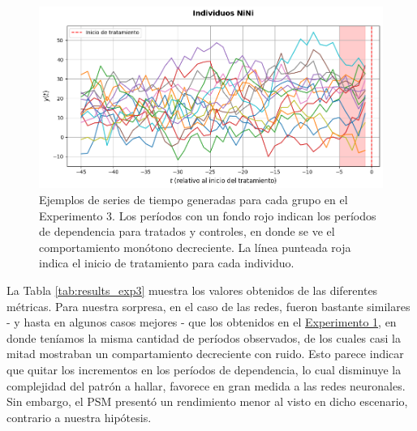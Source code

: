 \documentclass[../../main.tex]{subfiles}
\begin{document}
\begin{figure}[ht]
    \begin{minipage}{0.6\textwidth}
        \centering
        \includegraphics[scale=0.3]{figs/Exp3/ninis_sim63.png}
    \end{minipage}
    \caption{Ejemplos de series de tiempo generadas para cada grupo en el Experimento 3.
    Los períodos con un fondo rojo indican los períodos de dependencia para tratados y
    controles, en donde se ve el comportamiento monótono decreciente. La línea
    punteada roja indica el inicio de tratamiento para cada individuo.}
    \label{fig:time_series_exp3}
\end{figure}

La Tabla \ref{tab:results_exp3} muestra los valores obtenidos de las diferentes métricas.
Para nuestra sorpresa, en el caso de las redes, fueron bastante similares - y hasta en
algunos casos mejores - que los obtenidos en el \hyperref[sec:exp1]{Experimento 1}, en
donde teníamos la misma cantidad de períodos observados, de los cuales casi la mitad
mostraban un compartamiento decreciente con ruido. Esto parece indicar que quitar los
incrementos en los períodos de dependencia, lo cual disminuye la complejidad del patrón a
hallar, favorece en gran medida a las redes neuronales. Sin embargo, el PSM presentó un
rendimiento menor al visto en dicho escenario, contrario a nuestra hipótesis.
\end{document}
